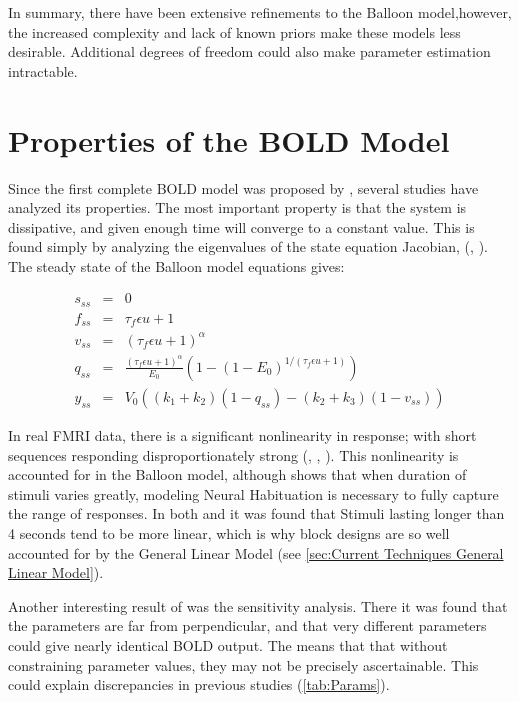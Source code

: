 In summary, there have been extensive refinements to the Balloon
model,however, the increased complexity and lack of known priors 
make these models less desirable. Additional degrees of freedom 
could also make parameter estimation intractable.

\section{Properties of the BOLD Model}
\label{sec:BOLD Analysis}
Since the first complete BOLD model was proposed by \cite{Friston2002}, 
several studies have analyzed its properties. 
The most important property is that the system is dissipative, and given
enough time will converge to a constant value. This is found simply by
analyzing the eigenvalues of the state equation Jacobian, 
(\cite{Deneux2006}, \cite{Hu2009}). The steady state of the Balloon
model equations gives:

\begin{eqnarray}
s_{ss} &=& 0 \nonumber \\
f_{ss} &=& \tau_f\epsilon u + 1\nonumber \\
v_{ss} &=& (\tau_f\epsilon u + 1)^\alpha\nonumber \\
q_{ss} &=& \frac{(\tau_f\epsilon u + 1)^\alpha}{E_0}(1-(1-E_0)^{1/(\tau_f\epsilon u + 1)})\nonumber \\
y_{ss} &=& V_0((k_1+k_2)(1-q_{ss}) - (k_2+k_3)(1-v_{ss}))
\label{eq:steadystate}
\end{eqnarray}

In real FMRI data, there is a significant nonlinearity in response; with short sequences
responding disproportionately strong (\cite{Birn2001}, \cite{Wager2005}, \cite{Deneux2006}).
This nonlinearity is accounted for in the Balloon model, although \cite{Deneux2006}
shows that when duration of stimuli varies greatly,
modeling Neural Habituation is necessary to fully capture the range of responses. 
In both \cite{Birn2001} and \cite{Deneux2006} it was found that 
Stimuli lasting longer than 4 seconds 
tend to be more linear, which is why block designs are so well accounted for
by the General Linear Model (see \autoref{sec:Current Techniques General Linear Model}).

Another interesting result of \cite{Deneux2006} was the sensitivity analysis.
There it was found that the parameters are far from perpendicular,
and that very different parameters could give nearly identical BOLD output.
The means that that without constraining parameter values, they may not be 
precisely ascertainable. This could explain discrepancies in previous studies
(\autoref{tab:Params}).

